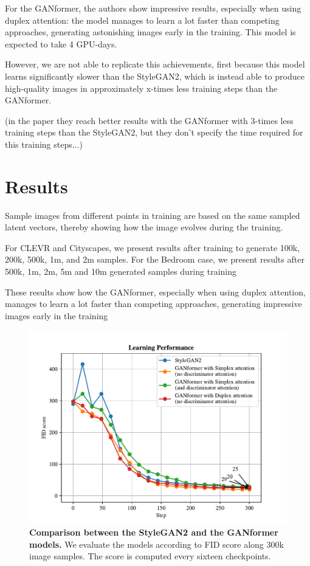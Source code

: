 \documentclass{article}
\begin{document}
	For the GANformer, the authors \cite{karras2020analyzing} show impressive results, especially when 
	using duplex attention: the model manages to learn a lot faster than competing approaches, 
	generating astonishing images early in the training. This model is expected to take 4 GPU-days.
	
	However, we are not able to replicate this achievements, first because this model learns significantly 
	slower than the StyleGAN2, which is instead able to produce high-quality images in approximately 
	x-times less training steps than the GANformer.
	
	(in the paper they reach better results with the GANformer with 3-times less training steps than the 
	StyleGAN2, but they don't specify the time required for this training steps...)

	\section{Results}%
	
	Sample images from different points in training are based on the same sampled latent vectors, 
	thereby showing how the image evolves during the training.
		
	For CLEVR and Cityscapes, we present results after training to generate 100k, 200k, 500k, 1m, and 
	2m samples. For the Bedroom case, we present results after 500k, 1m, 2m, 5m and 10m generated 
	samples during training
	
	These results show how the GANformer, especially when using duplex attention, manages to learn a 
	lot faster than competing approaches, generating impressive images early in the training
	
	\begin{figure}[htb]				
		\centering
		\includegraphics[width=.7\linewidth]{../src/trained_network/out_imgs/FIDscore.pdf}
		\caption{\textbf{Comparison between the StyleGAN2 and the GANformer models.} We evaluate 
		the models according to FID score along 300k image samples. The score is computed every 
		sixteen checkpoints.}
		\label{fig:performance}
	\end{figure}
	
\end{document}
